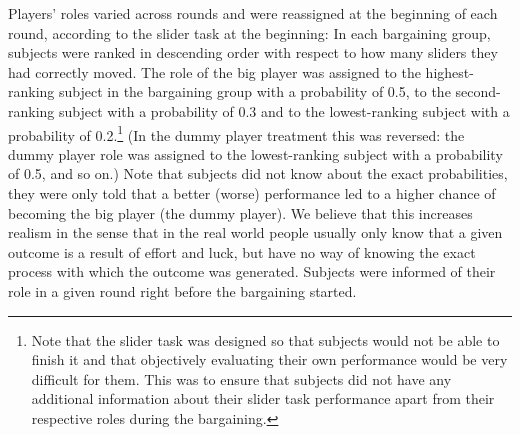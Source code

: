 \documentclass[12pt]{article}
\begin{document}
Players' roles varied across rounds and were reassigned at the beginning of each round, according to the slider task at the beginning: In each bargaining group, subjects were ranked in descending order with respect to how many sliders they had correctly moved. The role of the big player was assigned to the highest-ranking subject in the bargaining group with a probability of 0.5, to the second-ranking subject with a probability of 0.3 and to the lowest-ranking subject with a probability of 0.2.\footnote{Note that the slider task was designed so that subjects would not be able to finish it and that objectively evaluating their own performance would be very difficult for them. This was to ensure that subjects did not have any additional information about their slider task performance apart from their respective roles during the bargaining.} (In the dummy player treatment this was reversed: the dummy player role was assigned to the lowest-ranking subject with a probability of 0.5, and so on.) Note that subjects did not know about the exact probabilities, they were only told that a better (worse) performance led to a higher chance of becoming the big player (the dummy player). We believe that this increases realism in the sense that in the real world people usually only know that a given outcome is a result of effort and luck, but have no way of knowing the exact process with which the outcome was generated. Subjects were informed of their role in a given round right before the bargaining started.
\end{document}
